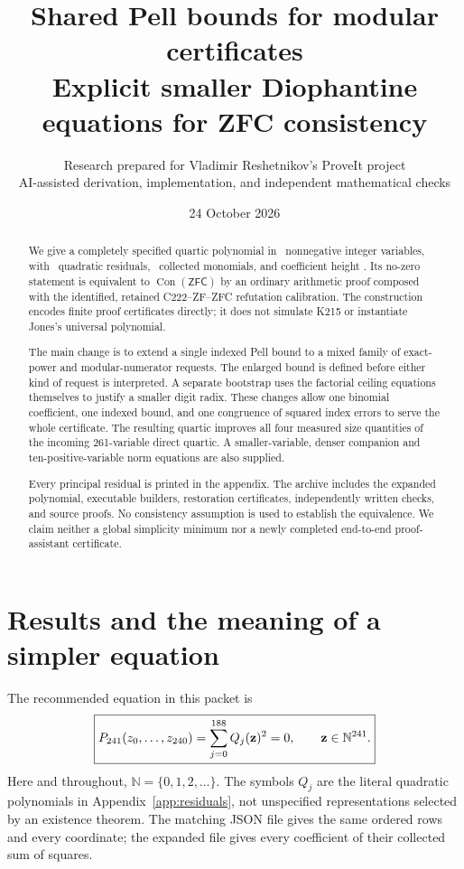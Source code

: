 \documentclass[11pt,letterpaper]{article}
\title{Shared Pell bounds for modular certificates\\[5pt]
\large Explicit smaller Diophantine equations for ZFC consistency}
\author{Research prepared for Vladimir Reshetnikov's ProveIt project\\
\small AI-assisted derivation, implementation, and independent mathematical checks}
\date{24 October 2026}
\newcommand{\N}{\mathbb N}
\newcommand{\Con}{\operatorname{Con}}
\newcommand{\ZFC}{\mathsf{ZFC}}
\theoremstyle{remark}\newtheorem{remark}[theorem]{Remark}
\begin{document}
\maketitle
\begin{abstract}
We give a completely specified quartic polynomial in \MainVars\ nonnegative
integer variables, with \MainRows\ quadratic residuals, \MainTerms\ collected
monomials, and coefficient height \MainHeight.  Its no-zero statement is
equivalent to $\Con(\ZFC)$ by an ordinary arithmetic proof composed with the
identified, retained C222--ZF--ZFC refutation calibration.  The construction
encodes finite proof certificates directly; it does not simulate K215 or
instantiate Jones's universal polynomial.

The main change is to extend a single indexed Pell bound to a mixed family
of exact-power and modular-numerator requests.  The enlarged bound is
defined before either kind of request is interpreted.  A separate bootstrap
uses the factorial ceiling equations themselves to justify a smaller digit
radix.  These changes allow one binomial coefficient, one indexed bound,
and one congruence of squared index errors to serve the whole certificate.
The resulting quartic improves all four measured size quantities of the
incoming 261-variable direct quartic.  A smaller-variable, denser companion
and ten-positive-variable norm equations are also supplied.

Every principal residual is printed in the appendix.  The archive includes
the expanded polynomial, executable builders, restoration certificates,
independently written checks, and source proofs.  No consistency assumption
is used to establish the equivalence.  We claim neither a global simplicity
minimum nor a newly completed end-to-end proof-assistant certificate.
\end{abstract}
\clearpage
\tableofcontents
\newpage

\section{Results and the meaning of a simpler equation}

The recommended equation in this packet is
\begin{equation}\label{eq:principal}
 \boxed{P_{\MainVars}(z_0,\ldots,z_{\MainLast})
       =\sum_{j=0}^{\MainRowLast} Q_j(\mathbf z)^2=0,
       \qquad \mathbf z\in\N^{\MainVars}.}
\end{equation}
Here and throughout, $\N=\{0,1,2,\ldots\}$.  The symbols $Q_j$ are the
literal quadratic polynomials in Appendix~\ref{app:residuals}, not
unspecified representations selected by an existence theorem.  The matching
JSON file gives the same ordered rows and every coordinate; the expanded
file gives every coefficient of their collected sum of squares.
\end{document}
